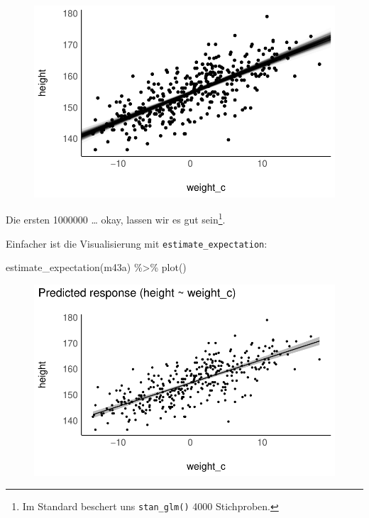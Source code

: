 \documentclass[
  a4paper,
  DIV=11]{scrreprt}
\newenvironment{Shaded}{\begin{snugshade}}{\end{snugshade}}
\newcommand{\FunctionTok}[1]{\textcolor[rgb]{0.28,0.35,0.67}{#1}}
\newcommand{\NormalTok}[1]{\textcolor[rgb]{0.00,0.23,0.31}{#1}}
\newcommand{\SpecialCharTok}[1]{\textcolor[rgb]{0.37,0.37,0.37}{#1}}
\theoremstyle{definition}
\theoremstyle{remark}
\begin{document}
\begin{figure}[H]

{\centering \includegraphics{./lineare-modelle_files/figure-pdf/Post-Regression-befragen-11-die-ersten-1000-1.pdf}

}

\end{figure}

Die ersten 1000000 \ldots{} okay, lassen wir es gut sein\footnote{Im
  Standard beschert uns \texttt{stan\_glm()} 4000 Stichproben.}.

Einfacher ist die Visualisierung mit \texttt{estimate\_expectation}:

\begin{Shaded}
\begin{Highlighting}[]
\FunctionTok{estimate\_expectation}\NormalTok{(m43a) }\SpecialCharTok{\%\textgreater{}\%} \FunctionTok{plot}\NormalTok{()}
\end{Highlighting}
\end{Shaded}

\begin{figure}[H]

{\centering \includegraphics{./lineare-modelle_files/figure-pdf/unnamed-chunk-24-1.pdf}

}

\end{figure}
\end{document}
